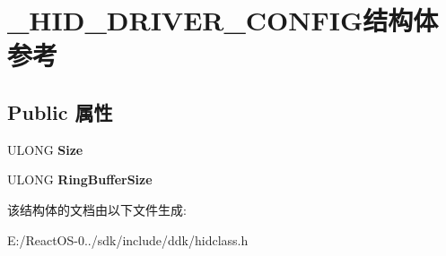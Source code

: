 \hypertarget{struct___h_i_d___d_r_i_v_e_r___c_o_n_f_i_g}{}\section{\+\_\+\+H\+I\+D\+\_\+\+D\+R\+I\+V\+E\+R\+\_\+\+C\+O\+N\+F\+I\+G结构体 参考}
\label{struct___h_i_d___d_r_i_v_e_r___c_o_n_f_i_g}
\subsection*{Public 属性}
\begin{DoxyCompactItemize}
\item 
\mbox{\label{struct___h_i_d___d_r_i_v_e_r___c_o_n_f_i_g_a9f8fa1454d67bc58e2a72d1d52d63d79}} 
U\+L\+O\+NG {\bfseries Size}
\item 
\mbox{\label{struct___h_i_d___d_r_i_v_e_r___c_o_n_f_i_g_a00d25c077cc6e4c08595de6680cb0666}} 
U\+L\+O\+NG {\bfseries Ring\+Buffer\+Size}
\end{DoxyCompactItemize}


该结构体的文档由以下文件生成\+:\begin{DoxyCompactItemize}
\item 
E\+:/\+React\+O\+S-\/0../sdk/include/ddk/hidclass.\+h\end{DoxyCompactItemize}
